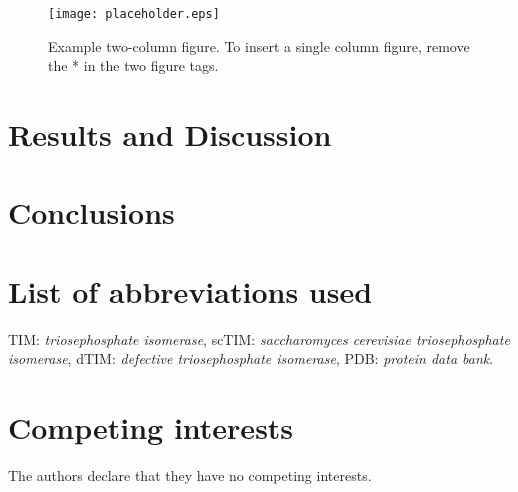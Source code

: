 \documentclass[twocolumn]{bmcart}%
\begin{document}
\begin{figure*}[t!]
  \centering
  \texttt{[image: placeholder.eps]}
  \caption{Example two-column figure. To insert a single column figure, remove the * in the two figure tags. }
  \label{fig:interface}
\end{figure*}


\section*{Results and Discussion}

\section*{Conclusions}


\begin{backmatter}

\section*{List of abbreviations used}
TIM: \textit{triosephosphate isomerase}, scTIM: \textit{saccharomyces
cerevisiae triosephosphate isomerase}, dTIM: \textit{defective triosephosphate
isomerase}, PDB: \textit{protein data bank}.

\section*{Competing interests}
The authors declare that they have no competing interests.






\end{backmatter}
\end{document}
